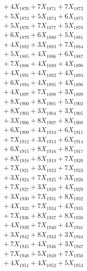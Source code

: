 \documentclass[a4paper,10pt]{article}
\begin{document}
{\begin{align}
&\;  + 4 X_{1870} + 7 X_{1871} + 7 X_{1872} \\[0.3ex]
&\;  + 5 X_{1873} + 5 X_{1874} + 6 X_{1875} \\[0.3ex]
&\;  + 5 X_{1876} + 7 X_{1877} + 5 X_{1878} \\[0.3ex]
&\;  + 6 X_{1879} + 6 X_{1880} + 5 X_{1881} \\[0.3ex]
&\;  + 4 X_{1882} + 3 X_{1883} + 7 X_{1884} \\[0.3ex]
&\;  + 5 X_{1885} + 4 X_{1886} + 6 X_{1887} \\[0.3ex]
&\;  + 7 X_{1888} + 4 X_{1889} + 4 X_{1890} \\[0.3ex]
&\;  + 4 X_{1891} + 4 X_{1892} + 4 X_{1893} \\[0.3ex]
&\;  + 6 X_{1894} + 4 X_{1895} + 4 X_{1896} \\[0.3ex]
&\;  + 4 X_{1897} + 7 X_{1898} + 3 X_{1899} \\[0.5ex]\allowbreak
&\;  + 8 X_{1900} + 8 X_{1901} + 5 X_{1902} \\[0.3ex]
&\;  + 8 X_{1903} + 3 X_{1904} + 3 X_{1905} \\[0.3ex]
&\;  + 3 X_{1906} + 8 X_{1907} + 8 X_{1908} \\[0.3ex]
&\;  + 6 X_{1909} + 4 X_{1910} + 6 X_{1911} \\[0.3ex]
&\;  + 7 X_{1912} + 3 X_{1913} + 6 X_{1914} \\[0.3ex]
&\;  + 6 X_{1915} + 8 X_{1916} + 8 X_{1917} \\[0.3ex]
&\;  + 8 X_{1918} + 8 X_{1919} + 7 X_{1920} \\[0.3ex]
&\;  + 7 X_{1921} + 3 X_{1922} + 7 X_{1923} \\[0.3ex]
&\;  + 3 X_{1924} + 7 X_{1925} + 3 X_{1926} \\[0.3ex]
&\;  + 7 X_{1927} + 3 X_{1928} + 4 X_{1929} \\[0.5ex]\allowbreak
&\;  + 3 X_{1930} + 7 X_{1931} + 8 X_{1932} \\[0.3ex]
&\;  + 4 X_{1933} + 7 X_{1934} + 4 X_{1935} \\[0.3ex]
&\;  + 7 X_{1936} + 8 X_{1937} + 8 X_{1938} \\[0.3ex]
&\;  + 4 X_{1939} + 7 X_{1940} + 4 X_{1941} \\[0.3ex]
&\;  + 3 X_{1942} + 8 X_{1943} + 3 X_{1944} \\[0.3ex]
&\;  + 7 X_{1945} + 4 X_{1946} + 3 X_{1947} \\[0.3ex]
&\;  + 7 X_{1948} + 5 X_{1949} + 7 X_{1950} \\[0.3ex]
&\;  + 4 X_{1951} + 4 X_{1952} + 5 X_{1953} \\[0.3ex]

\end{align}}
\end{document}
